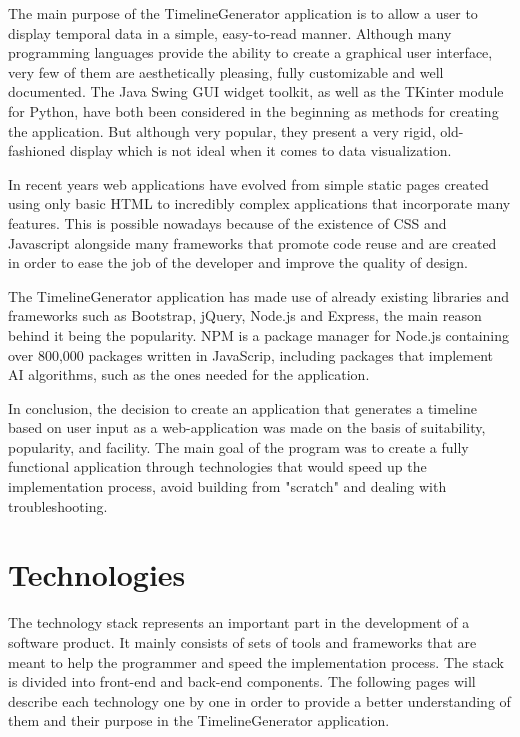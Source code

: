 \documentclass{report}
\begin{document}
The main purpose of the TimelineGenerator application is to allow a user to display temporal data in a simple, easy-to-read manner. Although many programming languages provide the ability to create a graphical user interface, very few of them are aesthetically pleasing, fully customizable and well documented. The Java Swing GUI widget toolkit, as well as the TKinter module for Python, have both been considered in the beginning as methods for creating the application. But although very popular, they present a very rigid, old-fashioned display which is not ideal when it comes to data visualization. \par

In recent years web applications have evolved from simple static pages created using only basic HTML to incredibly complex applications that incorporate many features. This is possible nowadays because of the existence of CSS and Javascript alongside many frameworks that promote code reuse and are created in order to ease the job of the developer and improve the quality of design. \par

The TimelineGenerator application has made use of already existing libraries and frameworks such as Bootstrap, jQuery, Node.js and Express, the main reason behind it being the popularity. NPM is a package manager for Node.js containing over 800,000 packages written in JavaScrip, including packages that implement AI algorithms, such as the ones needed for the application.

In conclusion, the decision to create an application that generates a timeline based on user input as a web-application was made on the basis of suitability, popularity, and facility. The main goal of the program was to create a fully functional application through technologies that would speed up the implementation process, avoid building from "scratch" and dealing with troubleshooting. \par

\newpage

\chapter {Technologies}

The technology stack represents an important part in the development of a software product. It mainly consists of sets of tools and frameworks that are meant to help the programmer and speed the implementation process. The stack is divided into front-end and back-end components. The following pages will describe each technology one by one in order to provide a better understanding of them and their purpose in the TimelineGenerator application. 
 
\end{document}
